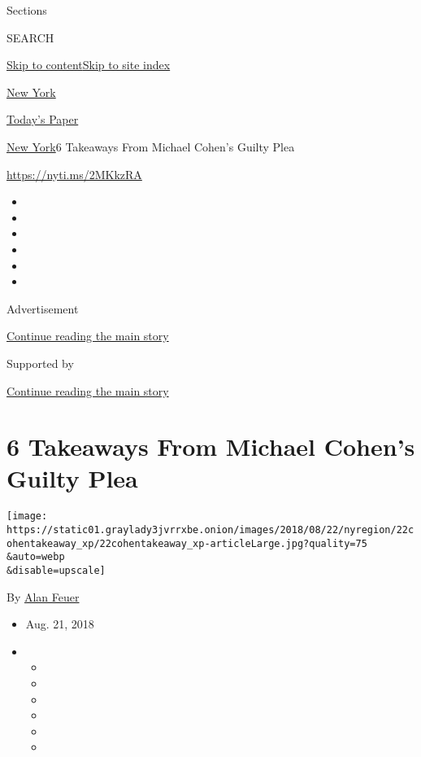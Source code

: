 Sections

SEARCH

\protect\hyperlink{site-content}{Skip to
content}\protect\hyperlink{site-index}{Skip to site index}

\href{https://www.nytimes3xbfgragh.onion/section/nyregion}{New York}

\href{https://myaccount.nytimes3xbfgragh.onion/auth/login?response_type=cookie\&client_id=vi}{}

\href{https://www.nytimes3xbfgragh.onion/section/todayspaper}{Today's
Paper}

\href{/section/nyregion}{New York}\textbar{}6 Takeaways From Michael
Cohen's Guilty Plea

\url{https://nyti.ms/2MKkzRA}

\begin{itemize}
\item
\item
\item
\item
\item
\item
\end{itemize}

Advertisement

\protect\hyperlink{after-top}{Continue reading the main story}

Supported by

\protect\hyperlink{after-sponsor}{Continue reading the main story}

\hypertarget{6-takeaways-from-michael-cohens-guilty-plea}{%
\section{6 Takeaways From Michael Cohen's Guilty
Plea}\label{6-takeaways-from-michael-cohens-guilty-plea}}

\texttt{[image: https://static01.graylady3jvrrxbe.onion/images/2018/08/22/nyregion/22cohentakeaway\_xp/22cohentakeaway\_xp-articleLarge.jpg?quality=75\\\&auto=webp\\\&disable=upscale]}

By \href{http://www.nytimes3xbfgragh.onion/by/alan-feuer}{Alan Feuer}

\begin{itemize}
\item
  Aug. 21, 2018
\item
  \begin{itemize}
  \item
  \item
  \item
  \item
  \item
  \item
  \end{itemize}
\end{itemize}


